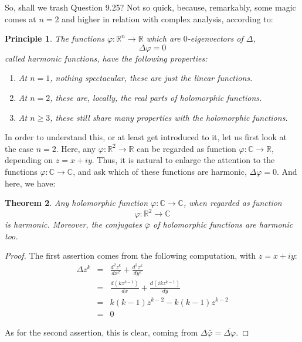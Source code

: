 \documentclass[12pt]{amsbook}
\newtheorem{theorem}{Theorem}[chapter]
\newtheorem{principle}[theorem]{Principle}
\begin{document}
\bigskip

So, shall we trash Question 9.25? Not so quick, because, remarkably, some magic comes at $n=2$ and higher in relation with complex analysis, according to:


\begin{principle}
The functions $\varphi:\mathbb R^n\to\mathbb R$ which are $0$-eigenvectors of $\Delta$,
$$\Delta\varphi=0$$
called harmonic functions, have the following properties:
\begin{enumerate}
\item At $n=1$, nothing spectacular, these are just the linear functions.

\item At $n=2$, these are, locally, the real parts of holomorphic functions.

\item At $n\geq 3$, these still share many properties with the holomorphic functions. 
\end{enumerate}
\end{principle}

In order to understand this, or at least get introduced to it, let us first look at the case $n=2$. Here, any $\varphi:\mathbb R^2\to\mathbb R$ can be regarded as function $\varphi:\mathbb C\to\mathbb R$, depending on $z=x+iy$. Thus, it is natural to enlarge the attention to the functions $\varphi:\mathbb C\to\mathbb C$, and ask which of these functions are harmonic, $\Delta\varphi=0$. And here, we have:

\begin{theorem}
Any holomorphic function $\varphi:\mathbb C\to\mathbb C$, when regarded as function
$$\varphi:\mathbb R^2\to\mathbb C$$
is harmonic. Moreover, the conjugates $\bar{\varphi}$ of holomorphic functions are harmonic too.
\end{theorem}

\begin{proof}
The first assertion comes from the following computation, with $z=x+iy$:
\begin{eqnarray*}
\Delta z^k
&=&\frac{d^2z^k}{dx^2}+\frac{d^2z^k}{dy^2}\\
&=&\frac{d(kz^{k-1})}{dx}+\frac{d(ikz^{k-1})}{dy}\\
&=&k(k-1)z^{k-2}-k(k-1)z^{k-2}\\
&=&0
\end{eqnarray*}

As for the second assertion, this is clear, coming from $\Delta\bar{\varphi}=\overline{\Delta\varphi}$.
\end{proof}
\end{document}
